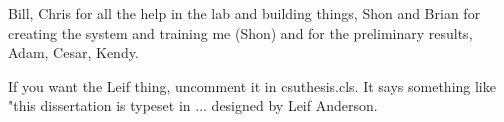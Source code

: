 \begin{acknowledgements}
Bill, Chris for all the help in the lab and building things, Shon and Brian for creating the system and training me (Shon) and for the preliminary results, Adam, Cesar, Kendy.

If you want the Leif thing, uncomment it in csuthesis.cls.  It says something like "this dissertation is typeset in ... designed by Leif Anderson.
\end{acknowledgements}